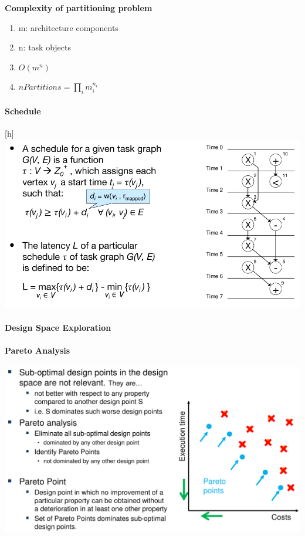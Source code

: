 \documentclass[english]{latex4ei/latex4ei_sheet}
\begin{document}
\textbf{Complexity of partitioning problem}
\begin{enumerate}
	\item m: architecture components
	\item n: task objects
	\item $O(m^n)$
	\item $nPartitions = \prod_i m_i^{n_i}$
\end{enumerate}

\paragraph{Schedule}

\begin{center}[h]
  \includegraphics[width=\linewidth]{assets/Schedule.png}
  \label{fig:schedule}
\end{center}

\paragraph{Design Space Exploration}

\paragraph{Pareto Analysis}

\begin{center}
  \centering
  \includegraphics[width=\linewidth]{assets/ParetoSlide.png}
  \label{fig:paretoslide}
\end{center}
\end{document}
